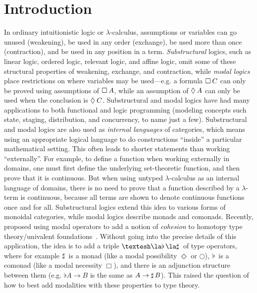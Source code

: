 
\section{Introduction}

In ordinary intuitionistic logic or $\lambda$-calculus, assumptions or
variables can go unused (weakening), be used in any order (exchange), be
used more than once (contraction), and be used in any position in a
term.  \emph{Substructural} logics, such as linear logic, ordered logic,
relevant logic, and affine logic, omit some of these structural
properties of weakening, exchange, and contraction, while \emph{modal
  logics} place restrictions on where variables may be used---e.g. a
formula $\Box_{} \, {C}$ can only be proved using assumptions of $\Box_{} \, {A}$,
while an assumption of $\Diamond_{} \, {A}$ can only be used when the conclusion
is $\Diamond_{} \, {C}$.  Substructural and modal logics have had many
applications to both functional and logic programming (modeling concepts
such state, staging, distribution, and concurrency, to name just a few).
Substructural and modal logics are also used as \emph{internal
  languages} of categories, which means using an appropriate logical
language to do constructions ``inside'' a particular mathematical
setting.  This often leads to shorter statements than working
``externally''.  For example, to define a function when working
externally in domains, one must first define the underlying
set-theoretic function, and then prove that it is continuous.  But when
using untyped $\lambda$-calculus as an internal language of domains,
there is no need to prove that a function described by a $\lambda$-term
is continuous, because all terms are shown to denote continuous
functions once and for all.  Substructural logics extend this idea to
various forms of monoidal categories, while modal logics describe monads
and comonads.  Recently,
\citet{schreibershulman12cohesive,shulman15realcohesion} proposed using
modal operators to add a notion of \emph{cohesion} to homotopy type
theory/univalent foundations~\citep{voevodsky06homotopy,uf13hott-book}.
Without going into the precise details of this application, the idea is
to add a triple $\sh{} \la \Flat{} \la \Sharp{}$ of type operators,
where for example $\sharp \, {}$ is a monad (like a modal possibility
$\Diamond$ or $\bigcirc$), $\flat \, {}$ is a comonad (like a modal
necessity $\Box$), and there is an adjunction structure between them
(e.g. $\flat{A} \to B$ is the same as $A \to \sharp \, {B}$).  This raised
the question of how to best add modalities with these properties to type
theory.

